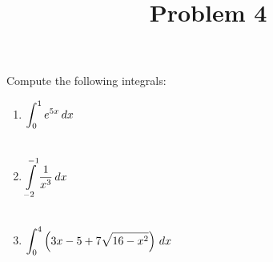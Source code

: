 \documentclass{ximera}
\title[Problem 4]{Problem 4}
\begin{document}
\begin{abstract} \end{abstract}
\maketitle

\begin{problem}
  Compute the following integrals:
  \begin{enumerate}

  \item  $\displaystyle \int_0^1 e^{5x} \,d x$ \\ \\
    
    \item  $\displaystyle \int\limits_{-2}^{-1} \dfrac{1}{x^3} \,d x$\\ \\
    
\item  $\displaystyle \int _0^4 \left( 3x - 5 + 7 \sqrt{16-x^2} \right) \,d x$
    

  \end{enumerate}
\end{problem}
\end{document}
